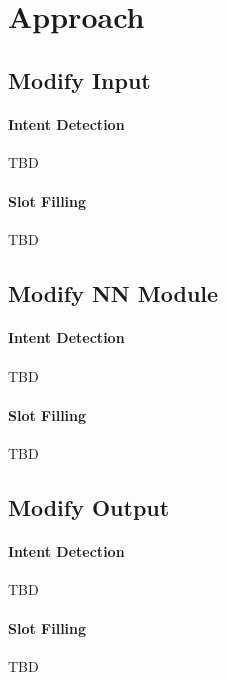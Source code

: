 \section{Approach}
\subsection{Modify Input}
\paragraph{Intent Detection}
TBD

\paragraph{Slot Filling}
TBD

\subsection{Modify NN Module}
\paragraph{Intent Detection}
TBD

\paragraph{Slot Filling}
TBD

\subsection{Modify Output}
\paragraph{Intent Detection}
TBD

\paragraph{Slot Filling}
TBD